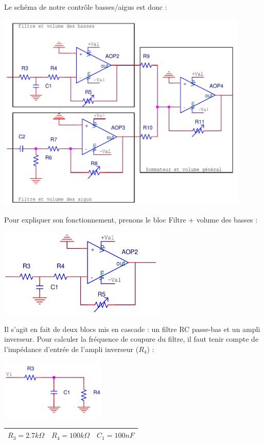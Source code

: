Le schéma de notre contrôle basses/aigus est donc :
\begin{center}
\includegraphics[width=12cm]{figures/egaliseur_sommateur.png}
\end{center}

Pour expliquer son fonctionnement, prenons le bloc Filtre + volume des basses :
\begin{center}
\includegraphics[width=8cm]{figures/AOPfiltrebasse.png}
\end{center}

Il s'agit en fait de deux blocs mis en cascade : un filtre RC passe-bas et un ampli inverseur.
Pour calculer la fréquence de coupure du filtre, il faut tenir compte de l'impédance d'entrée de l'ampli inverseur ($R_4$) :
\begin{center}
\includegraphics[width=5cm]{figures/filter.png}

\begin{tabular}{|c||c||c|}\hline
$R_3 = 2.7 k\Omega$ & $R_4 = 100 k\Omega$ & $C_1 = 100 nF$ \\ \hline
\end{tabular}
\end{center}

